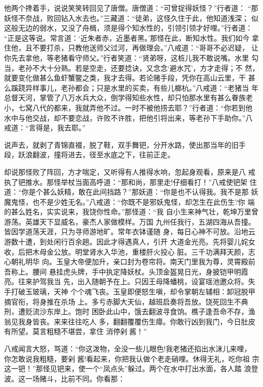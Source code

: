 他两个搀着手，说说笑笑转回见了唐僧。唐僧道：“可曾捉得妖怪？”行者道：
“那妖怪不奈战，败回钻入水去也。”三藏道：“徒弟，这怪久住于此，他知道浅深；
似这般无边的弱水，又没了舟楫，须是得个知水性的，引领引领才好哩。”行者道：
“正是这等说。常言道：‘近朱者赤，近墨者黑。’那怪在此，断知水性。我们如今
拿住他，且不要打杀，只教他送师父过河，再做理会。”八戒道：“哥哥不必迟疑，
让你先去拿他，等老猪看守师父。”行者笑道：“贤弟呀，这桩儿我不敢说嘴。水里
勾当，老孙不大十分熟。若是空走，还要捻诀，又念念‘避水咒’，方才走得；不
然，就要变化做甚么鱼虾蟹鳖之类，我才去得。若论赌手段，凭你在高山云里，干
甚么蹊跷异样事儿，老孙都会；只是水里的买卖，有些儿榔杭。”八戒道：“老猪当
年总督天河，掌管了八万水兵大众，倒学得知些水性，却只怕那水里有甚么眷族老
小，七窝八代的都来，我就弄他不过。一时不被他捞去耶？”行者道：“你若到他
水中与他交战，却不要恋战，许败不许胜，把他引将出来，等老孙下手助你。”八
戒道：“言得是，我去耶。”

说声去，就剥了青锦直裰，脱了鞋，双手舞钯，分开水路，使出那当年的旧手
段，跃浪翻波，撞将进去，径至水底之下，往前正走。

却说那怪败了阵回，方才喘定，又听得有人推得水响，忽起身观看，原来是八
戒执了钯推水。那怪举杖当面高呼道：“那和尚，那里走!仔细看打！”八戒使钯架
住道：“你是个甚么妖精，敢在此间挡路？”那妖道：“你是也不认得我。我不是那
妖魔鬼怪，也不是少姓无名。”八戒道：“你既不是邪妖鬼怪，却怎生在此伤生?你
端的甚么姓名，实实说来，我饶你性命。”那怪道：“我
自小生来神气壮，乾坤万里曾游荡。英雄天下显威名，豪杰人家做模样。万国
九州任我行，五湖四海从吾撞。皆因学道荡天涯，只为寻师游地旷。常年衣钵谨随
身，每日心神不可放。沿地云游数十遭，到处闲行百余趟。因此才得遇真人，引开
大道金光亮。先将婴儿姹女收，后把木母金公放。明堂肾水入华池，重楼肝火投心
脏。三千功满拜天颜，志心朝礼明华
向。玉皇大帝便加升，亲口封为卷帘将。南天门里我为尊，灵霄殿前吾称上。腰间
悬挂虎头牌，手中执定降妖杖。头顶金盔晃日光，身披铠甲明霞亮。往来护驾我当
先，出入随朝予在上。只因王母降蟠桃，设宴瑶池邀众将。失手打破玉玻璃，天神
个个魂飞丧。玉皇即便怒生嗔，却令掌朝左辅相：卸冠脱甲摘官衔，将身推在杀场
上。多亏赤脚大天仙，越班启奏将吾放。饶死回生不典刑，遭贬流沙东岸上。饱时
困卧此山中，饿去翻波寻食饷。樵子逢吾命不存，渔翁见我身皆丧。来来往往吃人
多，翻翻覆覆伤生瘴。你敢行凶到我门，今日肚皮有所望。莫言粗糙不堪尝，拿住
消停剁酱！”

八戒闻言大怒，骂道：“你这泼物，全没一些儿眼色!我老猪还掐出水沫儿来哩，
你怎敢说我粗糙，要剁酱!看起来，你把我认做个老走硝哩。休得无礼，吃你祖
宗这一钯！”那怪见钯来，使一个“凤点头”躲过。两个在水中打出水面，各人踏
浪登波。这一场赌斗，比前不同。你看那：

